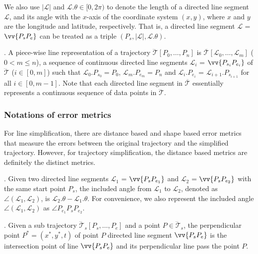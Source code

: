 We also use $|\mathcal{L}|$ and $\mathcal{L}.\theta\in [0, 2\pi)$ to denote the length of a directed line segment $\mathcal{L}$, and its angle with the $x$-axis of the coordinate system $(x, y)$, where $x$ and $y$ are the longitude and latitude, respectively.
That is, a directed line segment $\mathcal{L}$ = $\vv{P_{s}P_{e}}$ can be treated as a triple $(P_s, |\mathcal{L}|, \mathcal{L}.\theta)$.

. A piece-wise line representation of a trajectory $\dddot{\mathcal{T}}[P_0, \ldots, P_n]$ is $\overline{\mathcal{T}}[\mathcal{L}_0, \ldots , \mathcal{L}_m]$ ($0< m \le n$), a sequence of continuous directed line segments $\mathcal{L}_{i}$ = $\vv{P_{s_i}P_{e_i}}$ of $\dddot{\mathcal{T}}$ ($i\in[0,m]$)  such that $\mathcal{L}_{0}.P_{s_0} = P_0$, $\mathcal{L}_{m}.P_{e_m} = P_n$ and  $\mathcal{L}_{i}.P_{e_i}$ = $\mathcal{L}_{i+1}.P_{s_{i+1}}$ for all $i\in[0, m-1]$. Note that each directed line segment in $\overline{\mathcal{T}}$ essentially represents a continuous sequence of data points in $\dddot{\mathcal{T}}$.


\subsubsection{Notations of error metrics}

{For line simplification, there are distance based and shape based error metrics\cite{Shi:Survey} that measure the errors between the original trajectory and the simplified trajectory.
However, for trajectory simplification, the distance based metrics are definitely the distinct metrics.}

. Given two directed line segments $\mathcal{L}_1$ = $\vv{P_{s}P_{e_1}}$ and $\mathcal{L}_2$ = $\vv{P_{s}P_{e_2}}$ with the same start point $P_s$, the included angle from $\mathcal{L}_1$ to $\mathcal{L}_2$, denoted as $\angle(\mathcal{L}_1, \mathcal{L}_2)$,  is $\mathcal{L}_2.\theta - \mathcal{L}_1.\theta$. For convenience, we also represent the included angle  $\angle(\mathcal{L}_1, \mathcal{L}_2)$ as $\angle{P_{e_1}P_sP_{e_2}}$.

. Given a sub trajectory $\dddot{\mathcal{T}}_s[P_s, \ldots, P_e]$ and a point $P \in \dddot{\mathcal{T}}_s$, the perpendicular point $P^* = (x^*, y^*, t)$ of point $P$ \wrt directed line segment $\vv{P_sP_e}$ is the intersection point of line $\vv{P_sP_e}$ and its perpendicular line pass the point $P$. %

